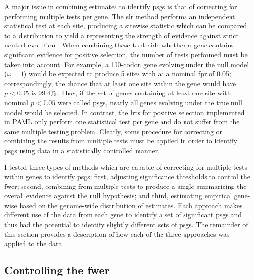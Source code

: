 A major issue in combining \sw estimates to identify \acp{psg} is that
of correcting for performing multiple \sw tests per gene. The \ac{slr}
method performs an independent statistical test at each site,
producing a sitewise statistic which can be compared to a \chisq
distribution to yield a \pv representing the strength of evidence
against strict neutral evolution \citep{Massingham2005}. When
combining these \pvs to decide whether a gene contains significant
evidence for positive selection, the number of tests performed must be
taken into account. For example, a 100-codon gene evolving under the
null model ($\omega=1$) would be expected to produce 5 sites with \pvs
at a nominal \ac{fpr} of 0.05; correspondingly, the chance that at
least one site within the gene would have $p<0.05$ is 99.4\%. Thus, if
the set of genes containing at least one site with nominal $p<0.05$
were called \acp{psg}, nearly all genes evolving under the true null
model would be selected. In contrast, the \ac{lrt}s for positive
selection implemented in PAML only perform one statistical test per
gene and do not suffer from the same multiple testing
problem. Clearly, some procedure for correcting or combining the
results from multiple tests must be applied in order to identify
\acp{psg} using \sw data in a statistically controlled manner.

I tested three types of methods which are capable of correcting for
multiple \sw tests within genes to identify \acp{psg}: first,
adjusting significance thresholds to control the \ac{fwer}; second,
combining \pvs from multiple tests to produce a single \pv summarizing
the overall evidence against the null hypothesis; and third,
estimating empirical gene-wise \pvs based on the genome-wide
distribution of \sw estimates. Each approach makes different use of
the \sw data from each gene to identify a set of significant \acp{psg}
and thus had the potential to identify slightly different sets of
\acp{psg}. The remainder of this section provides a description of how
each of the three approaches was applied to the \sw data.

\subsection{Controlling the \ac{fwer}}


